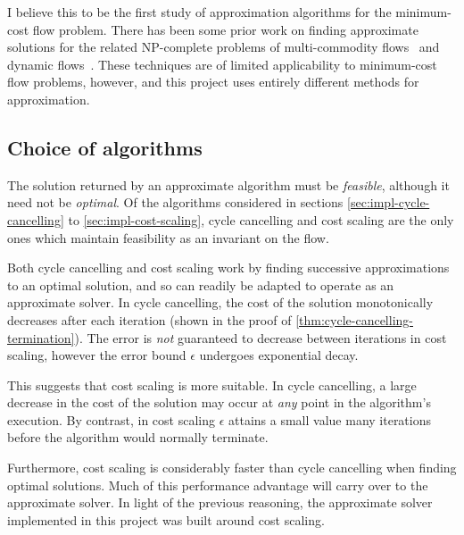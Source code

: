 I believe this to be the first study of approximation algorithms for the minimum-cost flow problem. There has been some prior work on finding approximate solutions for the related NP-complete problems of multi-commodity flows~\cite{Garg:2007} and dynamic flows~\cite{Hoppe:1994}. These techniques are of limited applicability to minimum-cost flow problems\footnotemark, however, and this project uses entirely different methods for approximation.

\subsection{Choice of algorithms} \label{sec:impl-approx-choice}

The solution returned by an approximate algorithm must be \emph{feasible}, although it need not be \emph{optimal}. Of the algorithms considered in sections \ref{sec:impl-cycle-cancelling} to \ref{sec:impl-cost-scaling}, cycle cancelling and cost scaling are the only ones which maintain feasibility as an invariant on the flow\footnotemark.

Both cycle cancelling and cost scaling work by finding successive approximations to an optimal solution, and so can readily be adapted to operate as an approximate solver. In cycle cancelling, the cost of the solution monotonically decreases after each iteration (shown in the proof of \cref{thm:cycle-cancelling-termination}). The error is \emph{not} guaranteed to decrease between iterations in cost scaling, however the error bound $\epsilon$ undergoes exponential decay.

This suggests that cost scaling is more suitable. In cycle cancelling, a large decrease in the cost of the solution may occur at \emph{any} point in the algorithm's execution. By contrast, in cost scaling $\epsilon$ attains a small value many iterations before the algorithm would normally terminate. 

Furthermore, cost scaling is considerably faster than cycle cancelling when finding optimal solutions. Much of this performance advantage will carry over to the approximate solver. In light of the previous reasoning, the approximate solver implemented in this project was built around cost scaling.

